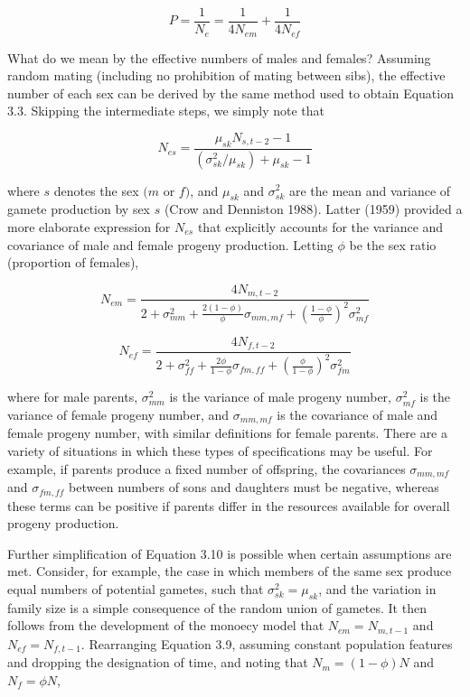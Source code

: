 \documentclass{article}
\begin{document}
\begin{equation}
P=\frac{1}{N_{e}}=\frac{1}{4N_{em}}+\frac{1}{4N_{ef}}
\tag{3.9}
\label{eq:3_9}
\end{equation}

What do we mean by the effective numbers of males and females? Assuming random mating (including no prohibition of mating between sibs), the effective number of each sex can be derived by the same method used to obtain Equation 3.3. Skipping the intermediate steps, we simply note that

\begin{equation}
N_{es}=\frac{\mu_{sk}N_{s,t-2}-1}{\left(\sigma_{sk}^{2}/\mu_{sk}\right)+\mu_{sk}-1}
\tag{3.10}
\label{eq:3_10}
\end{equation}

where $s$ denotes the sex $(m$ or $f)$, and $\mu_{sk}$ and $\sigma_{sk}^{2}$ are the mean and variance of gamete production by sex $s$ (Crow and Denniston 1988). Latter (1959) provided a more elaborate expression for $N_{es}$ that explicitly accounts for the variance and covariance of male and female progeny production. Letting $\phi$ be the sex ratio (proportion of females),

\begin{equation}
N_{em}=\frac{4N_{m,t-2}}{2+\sigma_{mm}^{2}+\frac{2(1-\phi)}{\phi}\sigma_{mm,mf}+\left(\frac{1-\phi}{\phi}\right)^{2}\sigma_{mf}^{2}}
\tag{3.11a}
\label{eq:3_11a}
\end{equation}

\begin{equation}
N_{ef}=\frac{4N_{f,t-2}}{2+\sigma_{ff}^{2}+\frac{2\phi}{1-\phi}\sigma_{fm,ff}+\left(\frac{\phi}{1-\phi}\right)^{2}\sigma_{fm}^{2}}
\tag{3.11b}
\label{eq:3_11b}
\end{equation}

where for male parents,  $ \sigma_{mm}^{2} $ is the variance of male progeny number,  $ \sigma_{mf}^{2} $ is the variance of female progeny number, and  $ \sigma_{mm,mf} $ is the covariance of male and female progeny number, with similar definitions for female parents. There are a variety of situations in which these types of specifications may be useful. For example, if parents produce a fixed number of offspring, the covariances  $ \sigma_{mm,mf} $ and  $ \sigma_{fm,ff} $ between numbers of sons and daughters must be negative, whereas these terms can be positive if parents differ in the resources available for overall progeny production.

Further simplification of Equation 3.10 is possible when certain assumptions are met. Consider, for example, the case in which members of the same sex produce equal numbers of potential gametes, such that  $ \sigma_{sk}^2 = \mu_{sk} $, and the variation in family size is a simple consequence of the random union of gametes. It then follows from the development of the monoecy model that  $ N_{em} = N_{m,t-1} $ and  $ N_{ef} = N_{f,t-1} $. Rearranging Equation 3.9, assuming constant population features and dropping the designation of time, and noting that  $ N_m = (1 - \phi)N $ and  $ N_f = \phi N $,
\end{document}
